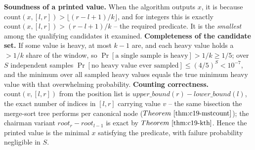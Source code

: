 \begin{proofbox}
\textbf{Soundness of a printed value.} When the algorithm outputs \(x\), it is because
\(\mathrm{count}(x,[l,r])>\lfloor(r-l+1)/k\rfloor\), and for integers this is exactly
\(\mathrm{count}(x,[l,r])>(r-l+1)/k\) -- the required predicate. It is the \emph{smallest}
among the qualifying candidates it examined. \textbf{Completeness of the candidate set.}
If some value is heavy, at most \(k-1\) are, and each heavy value holds a \(>1/k\) share of the
window, so \(\Pr[\text{a single sample is heavy}]>1/k\ge1/5\); over \(S\) independent samples
\(\Pr[\text{no heavy value ever sampled}]\le(4/5)^{S}<10^{-7}\), and the minimum over all
sampled heavy values equals the true minimum heavy value with that overwhelming probability.
\textbf{Counting correctness.} \(\mathrm{count}(v,[l,r])\) from the position list is
\(\mathit{upper\_bound}(r)-\mathit{lower\_bound}(l)\), the exact number of indices in
\([l,r]\) carrying value \(v\) -- the same bisection the merge-sort tree performs per canonical
node (\(\thmref{c19-mstcount}\)); the chairman variant \(\mathit{root}_r-\mathit{root}_{l-1}\)
is exact by \(\thmref{c19-kth}\). Hence the printed value is the minimal \(x\) satisfying the
predicate, with failure probability negligible in \(S\).
\end{proofbox}

